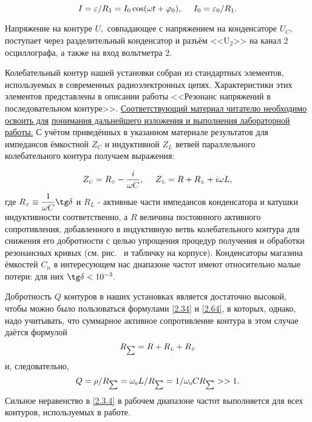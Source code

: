 \begin{equation}\eqmark{2.3.1}
	I=\varepsilon/R_1=I_0\cos(\omega t+\varphi_0),~~~~I_0=\varepsilon_0/R_1.
\end{equation}

Напряжение на контуре $U,$ совпадающее с напряжением на конденсаторе $U_C,$ поступает  через разделительный конденсатор и разъём <<$\text{U}_2$>> на канал 2 осциллографа, а также на вход вольтметра 2.%

Колебательный контур нашей установки собран из стандартных элементов, используемых в современных радиоэлектронных цепях. Характеристики этих элементов представлены в описании работы <<Резонанс напряжений в последовательном контуре>>. \underline{Соответствующий материал читателю необходимо освоить для} \underline{понимания дальнейшего изложения и выполнения лабораторной работы.} С учётом приведённых в указанном материале результатов для импедансов ёмкостной $Z_{\scriptscriptstyle{C}}$ и индуктивной $Z_{\scriptscriptstyle{L}}$ ветвей параллельного колебательного контура получаем выражения:

\begin{equation}\eqmark{2.3.2}
	Z_{\scriptscriptstyle{C}}=R_{\scriptscriptstyle{S}}-\dfrac{i}{\omega C},~~~~Z_{\scriptscriptstyle{L}}=R+R_{\scriptscriptstyle{L}}+i\omega L,
\end{equation}
где $R_{\scriptscriptstyle{S}}\equiv\dfrac{1}{\omega C}\tg\delta$ и $R_{\scriptscriptstyle{L}}$ - активные части импедансов конденсатора и катушки индуктивности соответственно, а $R$  величина постоянного активного сопротивления, добавленного в индуктивную ветвь колебательного контура для снижения его добротности с целью упрощения  процедур получения и обработки резонансных кривых (см. рис.~ и табличку на корпусе). Конденсаторы магазина ёмкостей $C_n$ в интересующем нас диапазоне частот имеют относительно малые потери: для них $\tg\delta<10^{-3}.$

Добротность $Q$ контуров в наших установках является достаточно высокой, чтобы можно было пользоваться формулами \eqref{2.34} и \eqref{2.64}, в которых, однако, надо учитывать, что суммарное активное сопротивление контура в этом случае даётся формулой
\begin{equation}\eqmark{2.3.3}
	R_{\scriptscriptstyle{\sum}}=R+R_{\scriptscriptstyle{L}}+R_{\scriptscriptstyle{S}}
\end{equation}
и, следовательно,
\begin{equation}\eqmark{2.3.4}
	Q=\rho/R_{\scriptscriptstyle{\sum}}=\omega_{\scriptscriptstyle{0}}L/R_{\scriptscriptstyle{\sum}}=1/\omega_{\scriptscriptstyle{0}}CR_{\scriptscriptstyle{\sum}}>>1.
\end{equation}
Сильное неравенство в \eqref{2.3.4} в рабочем диапазоне частот выполняется для всех контуров, используемых в работе.

